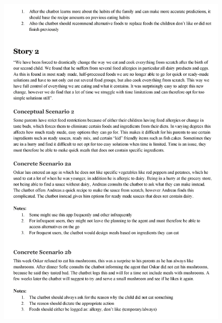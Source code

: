     \begin{figure}
        \centering
        \includegraphics[scale=0.8]{figures/scenario2.pdf}
    \end{figure} 
